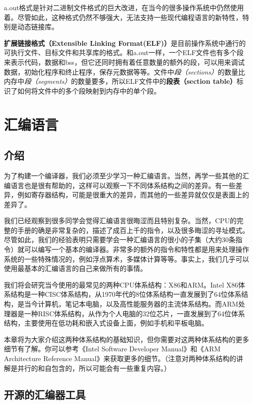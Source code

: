 \documentclass[cn,11pt,chinese]{elegantbook}
\begin{document}
a.out格式是针对二进制文件格式的巨大改进，在当今的很多操作系统中仍然使用着。尽管如此，这种格式仍然不够强大，无法支持一些现代编程语言的新特性，特别是动态链接库。

\textbf{扩展链接格式（Extensible Linking Format(ELF)）}是目前操作系统中通行的可执行文件、目标文件和共享库的格式。和a.out一样，一个ELF文件也有多个段来表示代码，数据和bss，但它还同时拥有着任意数量的额外的段，可以用来调试数据，初始化程序和终止程序，保存元数据等等。文件中\textit{段（sections）}的数量比内存中\textit{段（segments）}的数量要多，所以ELF文件中的\textbf{段表（section table）}标识了如何将文件中的多个段映射到内存中的单个段。

\chapter{汇编语言}

\section{介绍}

为了构建一个编译器，我们必须至少学习一种汇编语言。当然，再学一些其他的汇编语言也是很有帮助的，这样可以观察一下不同体系结构之间的差异。有一些差异，例如寄存器结构，可能是很重大的差异，而其他的一些差异就仅仅是表面上的差异了。

我们已经观察到很多同学会觉得汇编语言很晦涩而且特别复杂。当然，CPU的完整的手册的确是非常复杂的，描述了成百上千的指令，以及很多晦涩的寻址模式。尽管如此，我们的经验表明只需要学会一种汇编语言的很小的子集（大约30条指令）就可以编写一个基本的编译器。非常多的额外的指令和特性都是用来处理操作系统的一些特殊情况的，例如浮点算术，多媒体计算等等。事实上，我们几乎可以使用最基本的汇编语言的自己来做所有的事情。

我们将会研究当今使用的最常见的两种CPU体系结构：X86和ARM。Intel X86体系结构是一种CISC体系结构，从1970年代的8位体系结构一直发展到了64位体系结构，是当今计算机，笔记本电脑，以及高性能服务器的主流体系结构。而ARM处理器是一种RISC体系结构，从作为个人电脑的32位芯片，一直发展到了64位体系结构，主要使用在低功耗和嵌入式设备上面，例如手机和平板电脑。

本章将为大家介绍这两种体系结构的基础知识，但你需要对这两种体系结构的更多细节有了解。你可以参考《Intel Software Developer Manual》和《ARM Architecture Reference Manual》来获取更多的细节。（注意对两种体系结构的讲解是并行的和自包含的，所以可能会有一些重复内容。）

\section{开源的汇编器工具}
\end{document}
